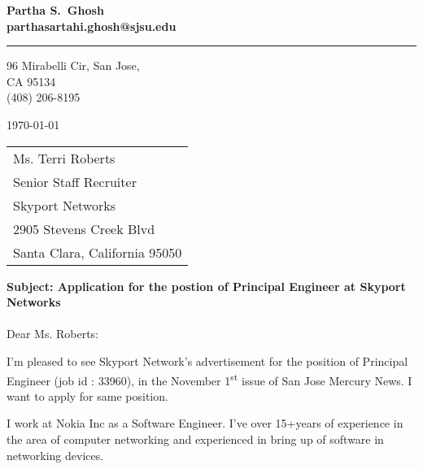 \documentclass{article} %
\begin{document}
\begin{flushleft}
  \large\bfseries Partha S.\ Ghosh \\
  \small {parthasartahi.ghosh@sjsu.edu} \\
\end{flushleft}
\medskip\hrule height 1pt
\begin{flushright}
  96 Mirabelli Cir, San Jose, \\ 
  CA 95134 \\
  (408) 206-8195
\end{flushright} 

\bigskip

\noindent \today

\bigskip

\noindent
\begin{tabular}{@{}l}
 	Ms. Terri Roberts \\
	Senior Staff Recruiter \\
	Skyport Networks \\
	2905 Stevens Creek Blvd  \\
	Santa Clara, California 95050
\end{tabular}

\bigskip
\textbf{Subject: Application for the postion of Principal Engineer at Skyport Networks\\} 
\\
\noindent Dear Ms. Roberts:

\setlength{\parskip}{\baselineskip}

\noindent I'm pleased to see Skyport Network's advertisement for the position of Principal Engineer (job id : 33960), in the November 1\textsuperscript{st} issue of San Jose Mercury News. I want to apply for same position. 

\noindent I work at Nokia Inc as a Software Engineer. I've over 15+years of experience in the area of computer networking and experienced in bring up of software in networking devices.  
\end{document}
